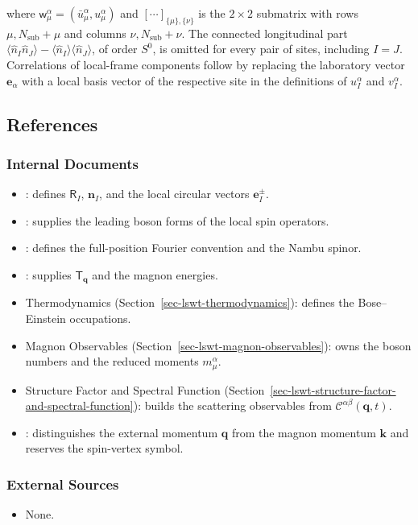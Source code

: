 where \(\mathsf w_\mu^\alpha=(\bar u_\mu^\alpha,u_\mu^\alpha)\) and \([\cdots]_{\{\mu\},\{\nu\}}\) is the \(2\times2\) submatrix with rows \(\mu,N_{\mathrm{sub}}+\mu\) and columns \(\nu,N_{\mathrm{sub}}+\nu\). The connected longitudinal part \(\langle\hat n_I\hat n_J\rangle-\langle\hat n_I\rangle\langle\hat n_J\rangle\), of order \(S^0\), is omitted for every pair of sites, including \(I=J\). Correlations of local-frame components follow by replacing the laboratory vector \(\mathbf e_\alpha\) with a local basis vector of the respective site in the definitions of \(u_I^\alpha\) and \(v_I^\alpha\).

\subsection{References}

\subsubsection{Internal Documents}

\begin{itemize}
\tightlist
\item
  : defines \(\mathsf R_I\), \(\mathbf n_I\), and the local circular vectors \(\mathbf e_I^\pm\).
\item
  : supplies the leading boson forms of the local spin operators.
\item
  : defines the full-position Fourier convention and the Nambu spinor.
\item
  : supplies \(\mathsf T_{\mathbf q}\) and the magnon energies.
\item
  Thermodynamics (Section~\ref{sec-lswt-thermodynamics}): defines the Bose--Einstein occupations.
\item
  Magnon Observables (Section~\ref{sec-lswt-magnon-observables}): owns the boson numbers and the reduced moments \(m_\mu^\alpha\).
\item
  Structure Factor and Spectral Function (Section~\ref{sec-lswt-structure-factor-and-spectral-function}): builds the scattering observables from \(\mathcal C^{\alpha\beta}(\mathbf q,t)\).
\item
  : distinguishes the external momentum \(\mathbf q\) from the magnon momentum \(\mathbf k\) and reserves the spin-vertex symbol.
\end{itemize}

\subsubsection{External Sources}

\begin{itemize}
\tightlist
\item
  None.
\end{itemize}
